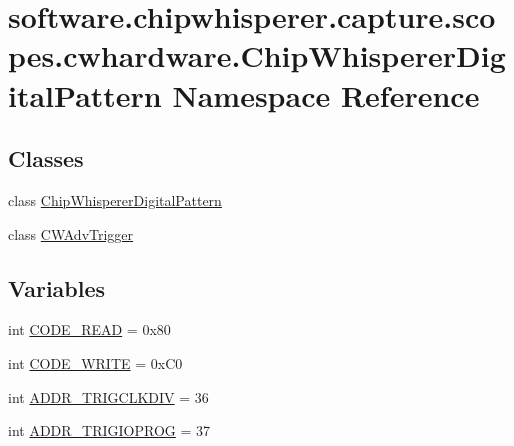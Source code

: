 \hypertarget{namespacesoftware_1_1chipwhisperer_1_1capture_1_1scopes_1_1cwhardware_1_1ChipWhispererDigitalPattern}{}\section{software.\+chipwhisperer.\+capture.\+scopes.\+cwhardware.\+Chip\+Whisperer\+Digital\+Pattern Namespace Reference}
\label{namespacesoftware_1_1chipwhisperer_1_1capture_1_1scopes_1_1cwhardware_1_1ChipWhispererDigitalPattern}
\subsection*{Classes}
\begin{DoxyCompactItemize}
\item 
class \hyperlink{classsoftware_1_1chipwhisperer_1_1capture_1_1scopes_1_1cwhardware_1_1ChipWhispererDigitalPattern_1_1ChipWhispererDigitalPattern}{Chip\+Whisperer\+Digital\+Pattern}
\item 
class \hyperlink{classsoftware_1_1chipwhisperer_1_1capture_1_1scopes_1_1cwhardware_1_1ChipWhispererDigitalPattern_1_1CWAdvTrigger}{C\+W\+Adv\+Trigger}
\end{DoxyCompactItemize}
\subsection*{Variables}
\begin{DoxyCompactItemize}
\item 
int \hyperlink{namespacesoftware_1_1chipwhisperer_1_1capture_1_1scopes_1_1cwhardware_1_1ChipWhispererDigitalPattern_a9a98491d18062d5c263554edc8b5b8be}{C\+O\+D\+E\+\_\+\+R\+E\+A\+D} = 0x80
\item 
int \hyperlink{namespacesoftware_1_1chipwhisperer_1_1capture_1_1scopes_1_1cwhardware_1_1ChipWhispererDigitalPattern_afb845e3dfa258a8b6000026d8ad8aced}{C\+O\+D\+E\+\_\+\+W\+R\+I\+T\+E} = 0x\+C0
\item 
int \hyperlink{namespacesoftware_1_1chipwhisperer_1_1capture_1_1scopes_1_1cwhardware_1_1ChipWhispererDigitalPattern_a27385c9ea53e2fcd2fb3eb9e3f49121d}{A\+D\+D\+R\+\_\+\+T\+R\+I\+G\+C\+L\+K\+D\+I\+V} = 36
\item 
int \hyperlink{namespacesoftware_1_1chipwhisperer_1_1capture_1_1scopes_1_1cwhardware_1_1ChipWhispererDigitalPattern_a62095de9666a46eb089d5880b80298c7}{A\+D\+D\+R\+\_\+\+T\+R\+I\+G\+I\+O\+P\+R\+O\+G} = 37
\end{DoxyCompactItemize}


